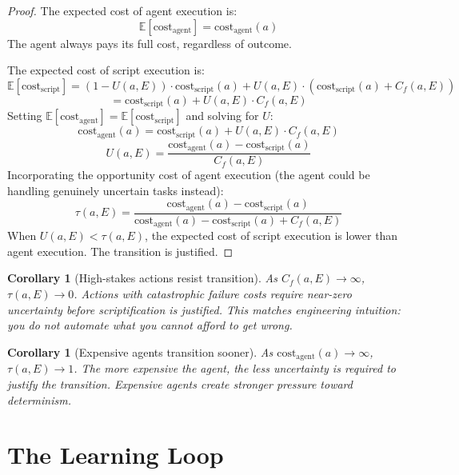 \documentclass[11pt]{article}
\newtheorem{corollary}[theorem]{Corollary}
\theoremstyle{definition}
\begin{document}
\begin{proof}
The expected cost of agent execution is:
\[
\mathbb{E}[\text{cost}_{\text{agent}}] =
\text{cost}_{\text{agent}}(a)
\]
The agent always pays its full cost, regardless of outcome.

The expected cost of script execution is:
\[
\mathbb{E}[\text{cost}_{\text{script}}] =
(1 - U(a,E)) \cdot \text{cost}_{\text{script}}(a) +
U(a,E) \cdot (\text{cost}_{\text{script}}(a) + C_f(a,E))
\]
\[
= \text{cost}_{\text{script}}(a) + U(a,E) \cdot C_f(a,E)
\]
Setting $\mathbb{E}[\text{cost}_{\text{agent}}] =
\mathbb{E}[\text{cost}_{\text{script}}]$ and solving for $U$:
\[
\text{cost}_{\text{agent}}(a) = \text{cost}_{\text{script}}(a) +
U(a,E) \cdot C_f(a,E)
\]
\[
U(a,E) = \frac{\text{cost}_{\text{agent}}(a) -
\text{cost}_{\text{script}}(a)}{C_f(a,E)}
\]
Incorporating the opportunity cost of agent execution (the agent
could be handling genuinely uncertain tasks instead):
\[
\tau(a, E) = \frac{\text{cost}_{\text{agent}}(a) -
\text{cost}_{\text{script}}(a)}{\text{cost}_{\text{agent}}(a) -
\text{cost}_{\text{script}}(a) + C_f(a, E)}
\]
When $U(a,E) < \tau(a,E)$, the expected cost of script execution is
lower than agent execution. The transition is justified.
\end{proof}

\begin{corollary}[High-stakes actions resist transition]
\label{cor:high-stakes}
As $C_f(a,E) \to \infty$, $\tau(a,E) \to 0$. Actions with
catastrophic failure costs require near-zero uncertainty before
scriptification is justified. This matches engineering intuition:
you do not automate what you cannot afford to get wrong.
\end{corollary}

\begin{corollary}[Expensive agents transition sooner]
\label{cor:expensive-agents}
As $\text{cost}_{\text{agent}}(a) \to \infty$, $\tau(a,E) \to 1$.
The more expensive the agent, the less uncertainty is required to
justify the transition. Expensive agents create stronger pressure
toward determinism.
\end{corollary}

\section{The Learning Loop}
\label{sec:learning-loop}
\end{document}
